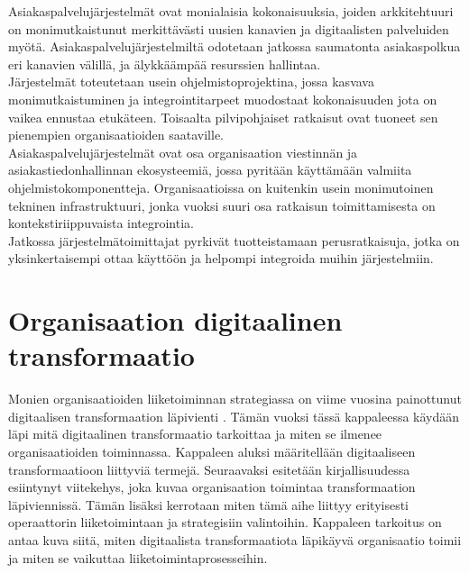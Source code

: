 \documentclass[finnish,12pt,a4paper,pdftex]{article}
\begin{document}
Asiakaspalvelujärjestelmät ovat monialaisia kokonaisuuksia, joiden arkkitehtuuri on monimutkaistunut merkittävästi uusien kanavien ja digitaalisten palveluiden myötä. Asiakaspalvelujärjestelmiltä odotetaan jatkossa saumatonta asiakaspolkua eri kanavien välillä, ja älykkäämpää resurssien hallintaa. \\

Järjestelmät toteutetaan usein ohjelmistoprojektina, jossa kasvava monimutkaistuminen ja integrointitarpeet muodostaat kokonaisuuden jota on vaikea ennustaa etukäteen. Toisaalta pilvipohjaiset ratkaisut ovat tuoneet sen pienempien organisaatioiden saataville.\\

Asiakaspalvelujärjestelmät ovat osa organisaation viestinnän ja asiakastiedonhallinnan ekosysteemiä, jossa pyritään käyttämään valmiita ohjelmistokomponentteja. Organisaatioissa on kuitenkin usein monimutoinen tekninen infrastruktuuri, jonka vuoksi suuri osa ratkaisun toimittamisesta on kontekstiriippuvaista integrointia.\\

Jatkossa järjestelmätoimittajat pyrkivät tuotteistamaan perusratkaisuja, jotka on yksinkertaisempi ottaa käyttöön ja helpompi integroida muihin järjestelmiin.


\clearpage

\section{Organisaation digitaalinen transformaatio}
Monien organisaatioiden liiketoiminnan strategiassa on viime vuosina painottunut digitaalisen transformaation läpivienti \citep{lamoureux}. Tämän vuoksi tässä kappaleessa käydään läpi mitä digitaalinen transformaatio tarkoittaa ja miten se ilmenee organisaatioiden toiminnassa. Kappaleen aluksi määritellään digitaaliseen transformaatioon liittyviä termejä. Seuraavaksi esitetään kirjallisuudessa esiintynyt viitekehys, joka kuvaa organisaation toimintaa transformaation läpiviennissä. Tämän lisäksi kerrotaan miten tämä aihe liittyy erityisesti operaattorin liiketoimintaan ja strategisiin valintoihin. Kappaleen tarkoitus on antaa kuva siitä, miten digitaalista transformaatiota läpikäyvä organisaatio toimii ja miten se vaikuttaa liiketoimintaprosesseihin.
\end{document}

